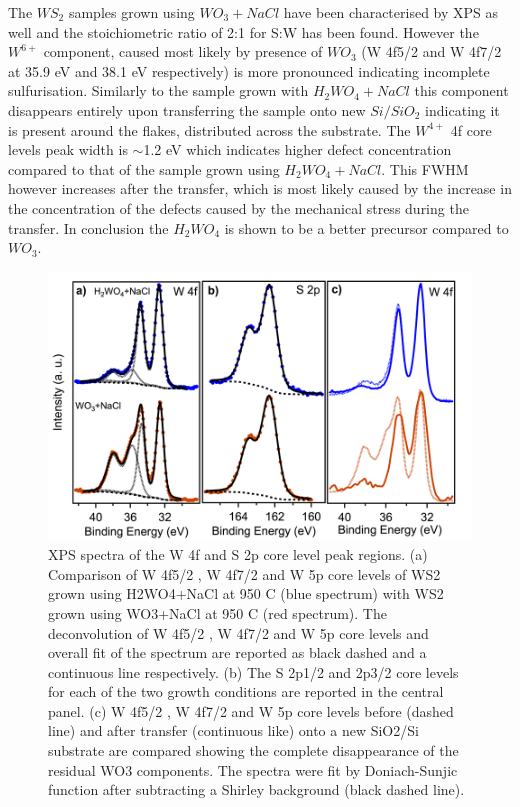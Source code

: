 The $WS_2$ samples grown using $WO_3 + NaCl$ have been characterised by XPS as well and the stoichiometric ratio of 2:1 for S:W has been found. However the $W^{6+}$ component, caused most likely by presence of $WO_3$ (W 4f5/2 and W 4f7/2 at 35.9 eV and 38.1 eV respectively) is more pronounced indicating incomplete sulfurisation. Similarly to the sample grown with $H_2WO_4 + NaCl$ this component disappears entirely upon transferring the sample onto new $Si/SiO_2$ indicating it is present around the flakes, distributed across the substrate. The $W^{4+}$ 4f core levels peak width is {$\sim$}1.2 eV which indicates higher defect concentration compared to that of the sample grown using $H_2WO_4 + NaCl$. This FWHM however increases after the transfer, which is most likely caused by the increase in the concentration of the defects caused by the mechanical stress during the transfer. In conclusion the $H_2WO_4$ is shown to be a better precursor compared to $WO_3$.
 
\begin{figure}[h]
\begin{center}
\includegraphics[scale=0.3]{PaperXPS.png}
\caption{XPS spectra of the W 4f and S 2p core level peak regions. (a) Comparison  of W 4f5/2 , W 4f7/2  and W 5p core levels of WS2 grown using H2WO4+NaCl at 950 {\degree}C (blue spectrum) with WS2 grown using WO3+NaCl at 950 {\degree}C (red spectrum). The deconvolution of W 4f5/2 , W 4f7/2  and W 5p core levels and overall fit of the spectrum are reported as black dashed and a continuous line respectively. (b) The S 2p1/2 and 2p3/2 core levels for each of the two growth conditions are reported in the central panel. (c) W 4f5/2 , W 4f7/2  and W 5p core levels before (dashed line) and after transfer (continuous like) onto a new SiO2/Si substrate are compared showing the complete disappearance of the residual WO3 components. The spectra were fit by Doniach-Sunjic function after subtracting a Shirley background (black dashed line).}
\label{fig:PaperXPS}
\end{center}
\end{figure}


